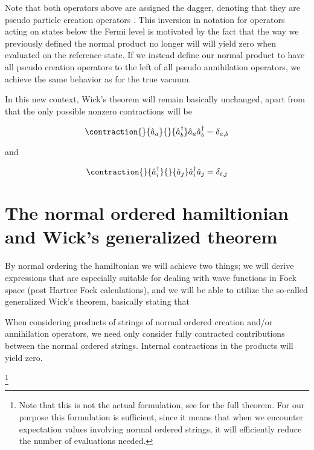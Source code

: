 Note that both operators above are assigned the dagger, denoting that they are pseudo particle creation operators \cite{ShavittBartlett2009}.  This inversion in notation for operators acting on states below the Fermi level is motivated by the fact that the way we previously defined the normal product no longer will will yield zero when evaluated on the reference state. If we instead define our normal product to have all pseudo creation operators to the left of all pseudo annihilation operators, we achieve the same behavior as for the true vacuum.

In this new context, Wick's theorem will remain basically unchanged, apart from that the only possible nonzero contractions will be

\begin{equation}
\contraction{}{\hat{a}_a}{}{\hat{a}_b^\dagger}
\hat{a}_a \hat{a}_b^\dagger = \delta_{a,b}
\label{eqn:nnz_contractions_1}
\end{equation}

and

\begin{equation}
\contraction{}{\hat{a}_i^\dagger}{}{\hat{a}_j}
\hat{a}_i^\dagger \hat{a}_j = \delta_{i,j}
\label{eqn:nnz_contractions_2}
\end{equation}


\section{The normal ordered hamiltionian and Wick's generalized theorem}

By normal ordering the hamiltonian we will achieve two things; we will derive expressions that are especially suitable for dealing with wave functions in Fock space (post Hartree Fock calculations), and we will be able to utilize the so-called generalized Wick's theorem, basically stating that

\begin{theorem}
When considering products of strings of normal ordered creation and/or annihilation operators, we need only consider fully contracted contributions between the normal ordered strings. Internal contractions in the products will yield zero.
\end{theorem}\footnote{Note that this is not the actual formulation, see \cite[p.86]{ShavittBartlett2009} for the full theorem. For our purpose this formulation is sufficient, since it means that when we encounter expectation values involving normal ordered strings, it will efficiently reduce the number of evaluations needed.}

